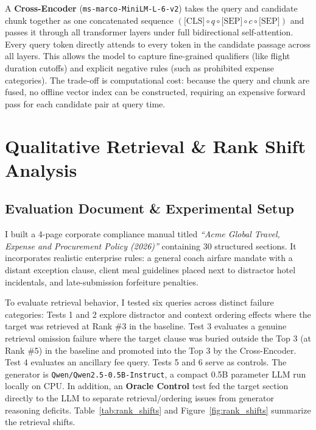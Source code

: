 \documentclass[11pt,a4paper]{article}
\begin{document}
A \textbf{Cross-Encoder} (\texttt{ms-marco-MiniLM-L-6-v2}) takes the query and candidate chunk together as one concatenated sequence $(\text{[CLS]} \circ q \circ \text{[SEP]} \circ c \circ \text{[SEP]})$ and passes it through all transformer layers under full bidirectional self-attention. Every query token directly attends to every token in the candidate passage across all layers. This allows the model to capture fine-grained qualifiers (like flight duration cutoffs) and explicit negative rules (such as prohibited expense categories). The trade-off is computational cost: because the query and chunk are fused, no offline vector index can be constructed, requiring an expensive forward pass for each candidate pair at query time.

\section{Qualitative Retrieval \& Rank Shift Analysis}

\subsection{Evaluation Document \& Experimental Setup}
I built a 4-page corporate compliance manual titled \textit{``Acme Global Travel, Expense and Procurement Policy (2026)''} containing 30 structured sections. It incorporates realistic enterprise rules: a general coach airfare mandate with a distant exception clause, client meal guidelines placed next to distractor hotel incidentals, and late-submission forfeiture penalties.

To evaluate retrieval behavior, I tested six queries across distinct failure categories: Tests 1 and 2 explore distractor and context ordering effects where the target was retrieved at Rank \#3 in the baseline. Test 3 evaluates a genuine retrieval omission failure where the target clause was buried outside the Top 3 (at Rank \#5) in the baseline and promoted into the Top 3 by the Cross-Encoder. Test 4 evaluates an ancillary fee query. Tests 5 and 6 serve as controls. The generator is \texttt{Qwen/Qwen2.5-0.5B-Instruct}, a compact 0.5B parameter LLM run locally on CPU. In addition, an \textbf{Oracle Control} test fed the target section directly to the LLM to separate retrieval/ordering issues from generator reasoning deficits. Table~\ref{tab:rank_shifts} and Figure~\ref{fig:rank_shifts} summarize the retrieval shifts.
\end{document}
